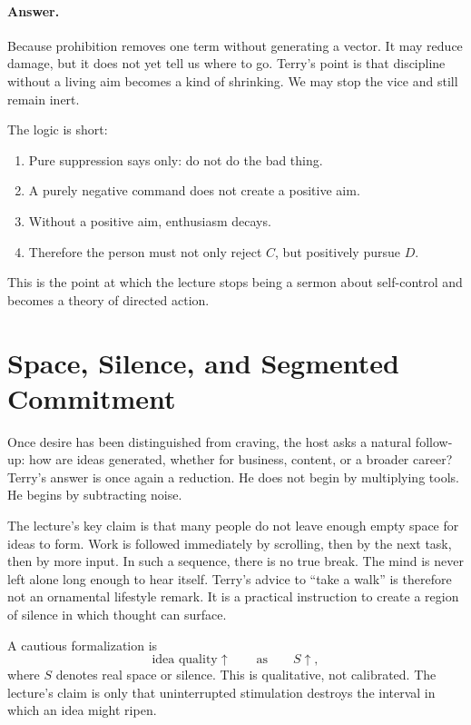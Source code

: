 \paragraph{Answer.} Because prohibition removes one term without generating a vector. It may reduce damage, but it does not yet tell us where to go. Terry's point is that discipline without a living aim becomes a kind of shrinking. We may stop the vice and still remain inert.

The logic is short:
\begin{enumerate}
\item Pure suppression says only: do not do the bad thing.
\item A purely negative command does not create a positive aim.
\item Without a positive aim, enthusiasm decays.
\item Therefore the person must not only reject \(C\), but positively pursue \(D\).
\end{enumerate}

This is the point at which the lecture stops being a sermon about self-control and becomes a theory of directed action.

\section{Space, Silence, and Segmented Commitment}

Once desire has been distinguished from craving, the host asks a natural follow-up: how are ideas generated, whether for business, content, or a broader career? Terry's answer is once again a reduction. He does not begin by multiplying tools. He begins by subtracting noise.

The lecture's key claim is that many people do not leave enough empty space for ideas to form. Work is followed immediately by scrolling, then by the next task, then by more input. In such a sequence, there is no true break. The mind is never left alone long enough to hear itself. Terry's advice to ``take a walk'' is therefore not an ornamental lifestyle remark. It is a practical instruction to create a region of silence in which thought can surface.

A cautious formalization is
\begin{equation}
\text{idea quality} \uparrow \qquad \text{as} \qquad S \uparrow,
\end{equation}
where \(S\) denotes real space or silence. This is qualitative, not calibrated. The lecture's claim is only that uninterrupted stimulation destroys the interval in which an idea might ripen.

